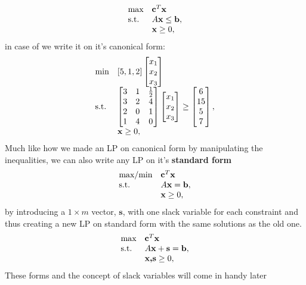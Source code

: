 \begin{align}\label{canonicalMax}
\begin{array}{ll@{}ll}
\text{max} &\textbf{c}^T\textbf{x}&\\
\text{s.t.} &A\textbf{x} \leq \textbf{b},&\\
&\textbf{x} \geq 0,&\\
\end{array}
\end{align}
in case of  we write it on it's canonical form:
\begin{align}
\begin{array}{ll@{}ll}
\text{min} &[5,1,2]\begin{bmatrix}x_{1} \\x_{2} \\x_{3}\end{bmatrix}&\\
\text{s.t.} &\begin{bmatrix}3&1&\frac{1}{2} \\3&2&4 \\2&0&1\\1&4&0\end{bmatrix}\begin{bmatrix}x_{1} \\x_{2} \\x_{3}\end{bmatrix} \geq \begin{bmatrix}6 \\15 \\5\\7\end{bmatrix},&\\
&\textbf{x} \geq 0,&\\
\end{array}
\end{align}
Much like how we made an LP on canonical form by manipulating the inequalities, we can also write any LP on it's \textbf{standard form} 
\begin{align}
\begin{array}{ll@{}ll}
\text{max/min} &\textbf{c}^T\textbf{x}&\\
\text{s.t.} &A\textbf{x} = \textbf{b},&\\
&\textbf{x} \geq 0,&\\
\end{array}
\end{align}
by introducing a $1\times m$ vector, $\textbf{s}$, with one slack variable for each constraint and thus creating a new LP on standard form with the same solutions as the old one.
\begin{align}
\begin{array}{ll@{}ll}
\text{max} &\textbf{c}^T\textbf{x}&\\
\text{s.t.} &A\textbf{x}+\textbf{s} =\textbf{b},&\\
&\textbf{x,s} \geq 0,&\\
\end{array}
\end{align}
These forms and the concept of slack variables will come in handy later
\iffalse
